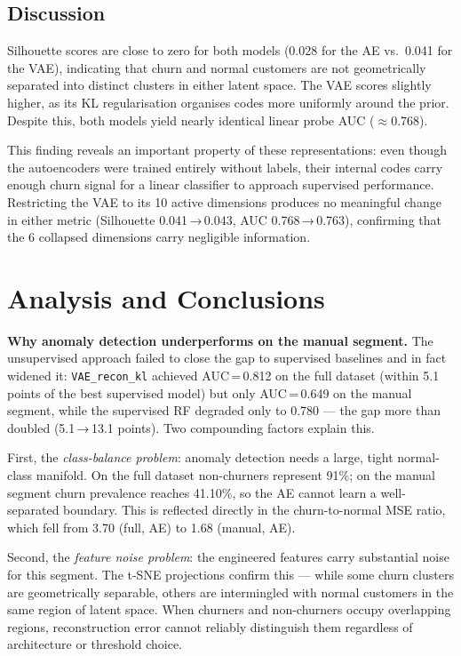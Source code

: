 \documentclass{article}
\begin{document}
\subsection{Discussion}

Silhouette scores are close to zero for both models (0.028 for the AE vs.\ 0.041 for
the VAE), indicating that churn and normal customers are not geometrically separated
into distinct clusters in either latent space. The VAE scores slightly higher, as its
KL regularisation organises codes more uniformly around the prior. Despite this, both
models yield nearly identical linear probe AUC ($\approx$0.768).

This finding reveals an important property of these representations: even though the
autoencoders were trained entirely without labels, their internal codes carry enough
churn signal for a linear classifier to approach supervised performance. Restricting
the VAE to its 10 active dimensions produces no meaningful change in either metric
(Silhouette 0.041\,→\,0.043, AUC 0.768\,→\,0.763), confirming that the 6 collapsed
dimensions carry negligible information.

\section{Analysis and Conclusions}

\textbf{Why anomaly detection underperforms on the manual segment.}
The unsupervised approach failed to close the gap to supervised baselines and in fact
widened it: \texttt{VAE\_recon\_kl} achieved AUC\,=\,0.812 on the full dataset
(within 5.1 points of the best supervised model) but only AUC\,=\,0.649 on the
manual segment, while the supervised RF degraded only to 0.780 --- the gap more than
doubled (5.1\,→\,13.1 points). Two compounding factors explain this.

First, the \textit{class-balance problem}: anomaly detection needs a large, tight
normal-class manifold. On the full dataset non-churners represent 91\%; on the manual
segment churn prevalence reaches 41.10\%, so the AE cannot learn a well-separated
boundary. This is reflected directly in the churn-to-normal MSE ratio, which fell
from 3.70 (full, AE) to 1.68 (manual, AE).

Second, the \textit{feature noise problem}: the engineered features carry substantial
noise for this segment. The t-SNE projections confirm this --- while some churn
clusters are geometrically separable, others are intermingled with normal customers in
the same region of latent space. When churners and non-churners occupy overlapping
regions, reconstruction error cannot reliably distinguish them regardless of
architecture or threshold choice.
\end{document}

